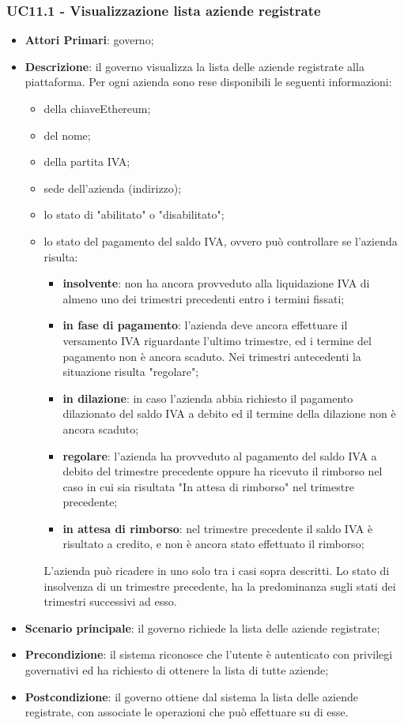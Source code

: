 \subsubsection{UC11.1 - Visualizzazione lista aziende registrate}
 \begin{itemize}
	\item \textbf{Attori Primari}: governo;
	\item \textbf{Descrizione}: il governo visualizza la lista delle aziende registrate alla piattaforma. Per ogni azienda sono rese disponibili le seguenti informazioni:
	\begin{itemize}
		\item della chiave\glosp Ethereum;
		\item del nome;
		\item della partita IVA;
		\item sede dell'azienda (indirizzo);
		\item lo stato di "abilitato" o "disabilitato";
		\item lo stato del pagamento del saldo IVA, ovvero può controllare se l'azienda risulta:
		\begin{itemize}
			\item \textbf{insolvente}: non ha ancora provveduto alla liquidazione IVA di almeno uno dei trimestri precedenti entro i termini fissati;
			\item \textbf{in fase di pagamento}: l'azienda deve ancora effettuare il versamento IVA riguardante l'ultimo trimestre, ed i termine del pagamento non è ancora scaduto. Nei trimestri antecedenti la situazione risulta "regolare";
			\item \textbf{in dilazione}: in caso l'azienda abbia richiesto il pagamento dilazionato del saldo IVA a debito ed il termine della dilazione non è ancora scaduto;
			\item \textbf{regolare}: l'azienda ha provveduto al pagamento del saldo IVA a debito del trimestre precedente oppure ha ricevuto il rimborso nel caso in cui sia risultata "In attesa di rimborso" nel trimestre precedente;
			\item \textbf{in attesa di rimborso}: nel trimestre precedente il saldo IVA è risultato a credito, e non è ancora stato effettuato il rimborso;
		\end{itemize}
	L'azienda può ricadere in uno solo tra i casi sopra descritti. Lo stato di insolvenza di un trimestre precedente, ha la predominanza sugli stati dei trimestri successivi ad esso.
	\end{itemize}
	
	\item \textbf{Scenario principale}: il governo richiede la lista delle aziende registrate;
	\item \textbf{Precondizione}: il sistema riconosce che l'utente è autenticato con privilegi governativi ed ha richiesto di ottenere la lista di tutte aziende;
	\item \textbf{Postcondizione}: il governo ottiene dal sistema la lista delle aziende registrate, con associate le operazioni che può effettuare su di esse.
\end{itemize}

